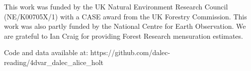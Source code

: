 \documentclass[draft,linenumbers]{agujournal}
\begin{document}
%




%
%
%
%
%
%
%


\acknowledgments
This work was funded by the UK Natural Environment Research Council (NE/K00705X/1) with a CASE award from the UK Forestry Commission. This work was also partly funded by the National Centre for Earth Observation. We are grateful to Ian Craig for providing Forest Research mensuration estimates.

Code and data available at: https://github.com/dalec-reading/4dvar\_dalec\_alice\_holt

\clearpage






\end{document}
